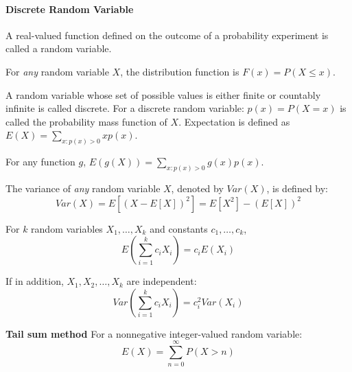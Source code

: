 \documentclass[10pt,twocolumn]{article}
\numberwithin{equation}{section}
\begin{document}
\paragraph{Discrete Random Variable}
\ben
\item A real-valued function defined on the outcome of a probability experiment is called
a random variable. 
\item For \textit{any} random variable $X$, the distribution function is $F(x) = P(X \le x)$. 
\item A random variable whose set of possible values is either finite or countably infinite
is called discrete. For a discrete random variable: $p(x) = P(X = x)$ is called the probability mass function of $X$. Expectation is defined as $E(X) = \sum_{x: p(x) > 0} x p(x)$. 
\item For any function $g$, $E(g(X)) = \sum_{x: p(x) > 0} g(x) p(x)$. 
\item The variance of \textit{any} random variable $X$, denoted by $Var(X)$, is defined by: 
\[
Var(X) = E[(X - E[X])^2] = E[X^2] - (E[X])^2 
\]
\item For $k$ random variables $X_1, \ldots, X_k$ and constants $c_1, \ldots, c_k$,
\[
E(\sum_{i=1}^{k} c_i X_i) = c_i E(X_i)
\]
\item If in addition, $X_1, X_2, \ldots, X_k$ are independent: 
\[
Var(\sum_{i=1}^{k} c_i X_i) = c_i^2 Var(X_i)
\]
\item \textbf{Tail sum method} For a nonnegative integer-valued random variable: 
\[
E(X) = \sum_{n=0}^{\infty} P(X >n)
\]
\een
\end{document}
